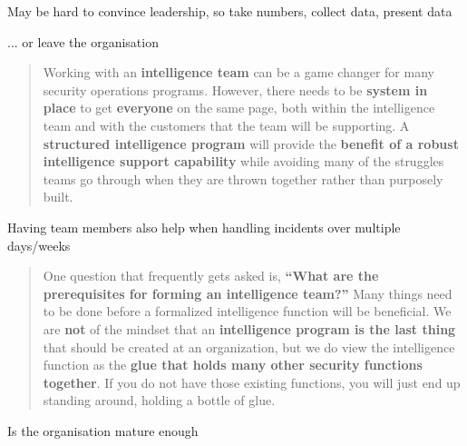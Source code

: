 \documentclass[Screen16to9,17pt]{foils}
\begin{document}
\begin{list2}
\item May be hard to convince leadership, so take numbers, collect data, present data
\item ... or leave the organisation
\end{list2}




\begin{quote}
Working with an {\bf intelligence team} can be a game changer for many security operations programs. However, there needs to be {\bf system in place} to get {\bf everyone} on the same page, both within the intelligence team and with the customers that the team will be supporting. A {\bf structured intelligence program} will provide the {\bf benefit of a robust intelligence support capability} while avoiding many of the struggles teams go through when they are thrown together rather than purposely built.
\end{quote}

\begin{list2}
\item Having team members also help when handling incidents over multiple days/weeks
\end{list2}



\begin{quote}
One question that frequently gets asked is, {\bf “What are the prerequisites for forming an intelligence team?”} Many things need to be done before a formalized intelligence function will be beneficial. We are {\bf not} of the mindset that an {\bf intelligence program is the last thing} that should be created at an organization, but we do view the intelligence function as the {\bf glue that holds many other security functions together}. If you do not have those existing functions, you will just end up standing around, holding a bottle of glue.
\end{quote}

\begin{list2}
    \item Is the organisation mature enough
\end{list2}



\end{document}
